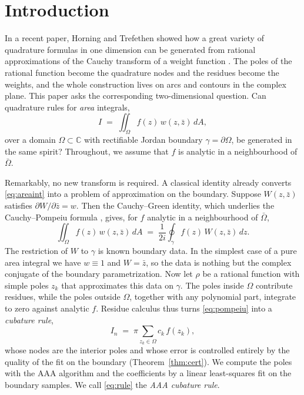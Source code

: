 \documentclass[onefignum,onetabnum]{siamart220329}
\newcommand{\C}{\mathbb{C}}
\newcommand{\dA}{\,dA}
\begin{document}
\section{Introduction}
\label{sec:intro}

In a recent paper, Horning and Trefethen showed how a great variety of
quadrature formulas in one dimension can be generated from rational
approximations of the Cauchy transform of a weight function
\cite{HorningTrefethen2026}. The poles of the rational function become
the quadrature nodes and the residues become the weights, and the whole
construction lives on arcs and contours in the complex plane. This
paper asks the corresponding two-dimensional question. Can quadrature
rules for \emph{area} integrals,
\begin{equation}
\label{eq:areaint}
I \;=\; \iint_\Omega f(z)\, w(z, \bar z) \dA ,
\end{equation}
over a domain $\Omega \subset \C$ with rectifiable Jordan boundary
$\gamma = \partial\Omega$, be generated in the same spirit? Throughout,
we assume that $f$ is analytic in a neighbourhood of $\bar\Omega$.

Remarkably, no new transform is required. A classical identity already
converts \eqref{eq:areaint} into a problem of approximation on the
boundary. Suppose $W(z,\bar z)$ satisfies
$\partial W/\partial\bar z=w$. Then the Cauchy--Green identity, which
underlies the Cauchy--Pompeiu formula \cite{Pompeiu}, gives, for $f$
analytic in a neighbourhood of $\bar\Omega$,
\begin{equation}
\label{eq:pompeiu}
\iint_\Omega f(z)\, w(z, \bar z) \dA
\;=\; \frac{1}{2i} \oint_\gamma f(z)\, W(z, \bar z)\, dz .
\end{equation}
The restriction of $W$ to $\gamma$ is known boundary data. In the
simplest case of a pure area integral we have $w \equiv 1$ and
$W = \bar z$, so the data is nothing but the complex conjugate of the
boundary parametrization. Now let $\rho$ be a rational function with
simple poles $z_k$ that approximates this data on $\gamma$. The poles
inside $\Omega$ contribute residues, while the poles outside $\Omega$,
together with any polynomial part, integrate to zero against analytic
$f$. Residue calculus thus turns \eqref{eq:pompeiu} into a
\emph{cubature rule},
\begin{equation}
\label{eq:rule}
I_n \;=\; \pi \sum_{z_k \in \Omega} c_k\, f(z_k),
\end{equation}
whose nodes are the interior poles and whose error is controlled
entirely by the quality of the fit on the boundary
(Theorem~\ref{thm:cert}). We compute the poles with the AAA algorithm
\cite{NST2018,NakatsukasaTrefethen2025,TrefethenWilber2025} and the
coefficients by a linear least-squares fit on the boundary samples. We
call \eqref{eq:rule} the \emph{AAA cubature rule}.
\end{document}
